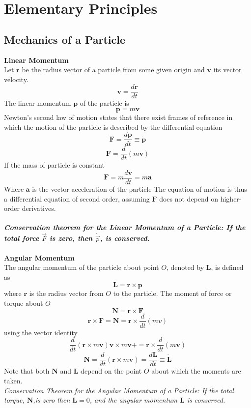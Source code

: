 \chapter{Elementary Principles}
\section{Mechanics of a Particle}
\textbf{Linear Momentum}\\
Let $\textbf{r}$ be the radius vector of a particle from some given origin and $\textbf{v}$ its vector velocity.
$$\textbf{v}=\frac{d\textbf{r}}{dt}$$
The linear momentum $\textbf{p}$ of the particle is 
$$\textbf{p}=m\textbf{v}$$
Newton's second law of motion  states that there exist frames of reference in which the motion of the particle is described by the differential equation
$$\textbf{F}=\frac{d\textbf{p}}{dt}\equiv\dot{\textbf{p}}$$
$$\textbf{F}=\frac{d}{dt}(m\textbf{v})$$
If the mass of particle is constant
$$\textbf{F}=m\frac{d\textbf{v}}{dt}=m\textbf{a}$$
Where $\textbf{a}$ is the vector acceleration of the particle
The equation of motion is thus a differential equation of second order, assuming $\textbf{F}$ does not depend on higher-order derivatives.\\\\
\textbf{\textit{Conservation theorem for the Linear Momentum of a Particle: If the total force $\vec{F}$ is zero, then $\dot{\vec{p}}$, is conserved.}}\vspace{0.5cm}
\\\\
\textbf{Angular Momentum}\vspace{0.2cm}\\
The angular momentum of the particle about point $O$, denoted by $\textbf{L}$, is defined as
$$\textbf{L}=\textbf{r}\times\textbf{p}$$
where $\textbf{r}$ is the radius vector from $O$ to the particle. The moment of force or torque about $O$ 
 $$\textbf{N}=\textbf{r}\times\textbf{F}$$
 $$\textbf{r}\times\textbf{F}=\textbf{N}=\textbf{r}\times\frac{d}{dt}(mv)$$
 using the vector identity
 $$\frac{d}{dt}(\textbf{r}\times m\textbf{v})\textbf{v}\times m\textbf{v}+=\textbf{r}\times\frac{d}{dt}(m\textbf{v})$$
$$\textbf{N}=\frac{d}{dt}(\textbf{r}\times m\textbf{v})=\frac{d\textbf{L}}{dt}\equiv \dot{\textbf{L}}$$
Note that both $\textbf{N}$ and $\textbf{L}$ depend on the point $O$ about which the moments are taken.\\
\textit{Conservation Theorem for the Angular Momentum of a Particle: If the total torque, $\textbf{N}$,is zero then $\dot{\textbf{L}}=0$, and the angular momentum $\textbf{L}$ is conserved. }\\
